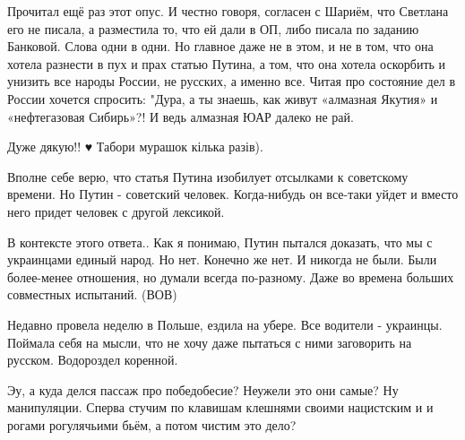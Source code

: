 \begin{itemize}
 

Прочитал ещё раз этот опус. И честно говоря, согласен с Шариём, что Светлана
его не писала, а разместила то, что ей дали в ОП, либо писала по заданию
Банковой. Слова одни в одни. Но главное даже не в этом, и не в том, что она
хотела разнести в пух и прах статью Путина, а том, что она хотела оскорбить и
унизить все народы России, не русских, а именно все. Читая про состояние дел в
России хочется спросить: "Дура, а ты знаешь, как живут «алмазная Якутия» и
«нефтегазовая Сибирь»?! И ведь алмазная ЮАР далеко не рай.

 
Дуже дякую!! ♥️
Табори мурашок кілька разів).

 

Вполне себе верю, что статья Путина изобилует отсылками к советскому времени.
Но Путин - советский человек. Когда-нибудь он все-таки уйдет и вместо него
придет человек с другой лексикой.

В контексте этого ответа.. Как я понимаю, Путин пытался доказать, что мы с
украинцами единый народ. Но нет. Конечно же нет. И никогда не были. Были
более-менее отношения, но думали всегда по-разному. Даже во времена больших
совместных испытаний. (ВОВ)

Недавно провела неделю в Польше, ездила на убере. Все водители - украинцы.
Поймала себя на мысли, что не хочу даже пытаться с ними заговорить на русском.
Водороздел коренной.

 
Эу, а куда делся пассаж про победобесие? Неужели это они самые? Ну манипуляции. Сперва стучим по клавишам клешнями своими нацистским и и рогами рогулячьими бьём, а потом чистим это дело?


\end{itemize}
